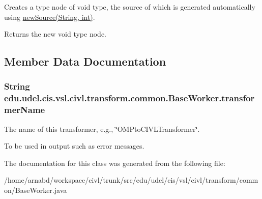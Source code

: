 Creates a type node of void type, the source of which is generated automatically using \hyperlink{classedu_1_1udel_1_1cis_1_1vsl_1_1civl_1_1transform_1_1common_1_1BaseWorker_a45d64b7e09a96de3fe161198a0ad8f5a}{new\+Source(\+String, int)}. 

\begin{DoxyReturn}{Returns}
the new void type node. 
\end{DoxyReturn}


\subsection{Member Data Documentation}
\hypertarget{classedu_1_1udel_1_1cis_1_1vsl_1_1civl_1_1transform_1_1common_1_1BaseWorker_ac0c58f181ddacf06a1b997857d8641ab}{}
\subsubsection[{transformer\+Name}]{\setlength{\rightskip}{0pt plus 5cm}String edu.\+udel.\+cis.\+vsl.\+civl.\+transform.\+common.\+Base\+Worker.\+transformer\+Name\hspace{0.3cm}{\ttfamily [protected]}}\label{classedu_1_1udel_1_1cis_1_1vsl_1_1civl_1_1transform_1_1common_1_1BaseWorker_ac0c58f181ddacf06a1b997857d8641ab}


The name of this transformer, e.\+g., \char`\"{}\+O\+M\+Pto\+C\+I\+V\+L\+Transformer\char`\"{}. 

To be used in output such as error messages. 

The documentation for this class was generated from the following file\+:\begin{DoxyCompactItemize}
\item 
/home/arnabd/workspace/civl/trunk/src/edu/udel/cis/vsl/civl/transform/common/Base\+Worker.\+java\end{DoxyCompactItemize}
